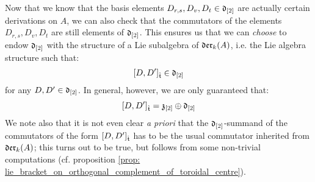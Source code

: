         \begin{remark}
            Now that we know that the basis elements $D_{r, s}, D_v, D_t \in \mathfrak{d}_{[2]}$ are actually certain derivations on $A$, we can also check that the commutators of the elements $D_{r, s}, D_v, D_t$ are still elements of $\mathfrak{d}_{[2]}$. This ensures us that we can \textit{choose} to endow $\mathfrak{d}_{[2]}$ with the structure of a Lie subalgebra of $\mathfrak{der}_{k}(A)$, i.e. the Lie algebra structure such that:
                $$[D, D']_{\hat{\mathfrak{t}}} \in \mathfrak{d}_{[2]}$$
            for any $D, D' \in \mathfrak{d}_{[2]}$. In general, however, we are only guaranteed that:
                $$[D, D']_{\hat{\mathfrak{t}}} = \mathfrak{z}_{[2]} \oplus \mathfrak{d}_{[2]}$$
            We note also that it is not even clear \textit{a priori} that the $\mathfrak{d}_{[2]}$-summand of the commutators of the form $[D, D']_{\hat{\mathfrak{t}}}$ has to be the usual commutator inherited from $\mathfrak{der}_{k}(A)$; this turns out to be true, but follows from some non-trivial computations (cf. proposition \ref{prop: lie_bracket_on_orthogonal_complement_of_toroidal_centre}). 
        \end{remark}

